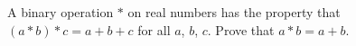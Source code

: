 A binary operation $*$ on real numbers has the property that $(a * b) * c = a+b+c$ for all $a$, $b$, $c$. Prove that $a * b = a+b$.